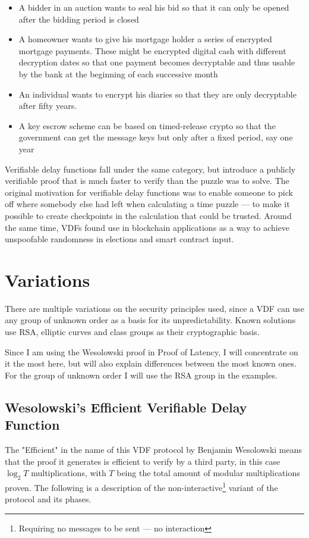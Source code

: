 \begin{itemize}
	\item A bidder in an auction wants to seal his bid so that it can only be opened after the bidding period is closed 
	\item A homeowner wants to give his mortgage holder a series of encrypted mortgage payments. These might be encrypted digital cash with different decryption dates so that one payment becomes decryptable and thus usable by the bank at the beginning of each successive month
	\item An individual wants to encrypt his diaries so that they are only decryptable after fifty years.
	\item A key escrow scheme can be based on timed-release crypto so that the government can get the message keys but only after a fixed period, say one year
\end{itemize}

Verifiable delay functions fall under the same category, but introduce a publicly verifiable proof that is much faster to verify than the puzzle was to solve. The original motivation for verifiable delay functions was to enable someone to pick off where somebody else had left when calculating a time puzzle --- to make it possible to create checkpoints in the calculation that could be trusted. Around the same time, VDFs found use in blockchain applications as a way to achieve unspoofable randomness in elections and smart contract input.


\section{Variations}
There are multiple variations on the security principles used, since a VDF can use any group of unknown order as a basis for its unpredictability. Known solutions use RSA, elliptic curves and class groups as their cryptographic basis.


Since I am using the Wesolowski proof in Proof of Latency, I will concentrate on it the most here, but will also explain differences between the most known ones. For the group of unknown order I will use the RSA group in the examples.

\subsection{Wesolowski's Efficient Verifiable Delay Function}
The "Efficient" in the name of this VDF protocol by Benjamin Wesolowski means that the proof it generates is efficient to verify by a third party, in this case \( \log _{2} T \) multiplications, with \( T \) being the total amount of modular multiplications proven. The following is a description of the non-interactive\footnote{Requiring no messages to be sent --- no interaction} variant of the protocol and its phases.

